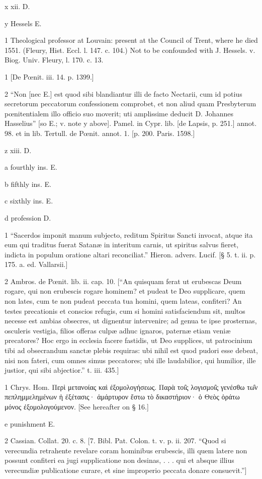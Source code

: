 x
xii. D.

y
Hessels E.

1
Theological professor at Louvain: present at the Council of Trent, where he died 1551. (Fleury, Hist. Eccl. l. 147. c. 104.) Not to be confounded with J. Hessels. v. Biog. Univ. Fleury, l. 170. c. 13.

1
[De Pœnit. iii. 14. p. 1399.]

2
“Non [nec E.] est quod sibi blandiantur illi de facto Nectarii, cum id potius secretorum peccatorum confessionem comprobet, et non aliud quam Presbyterum pœnitentialem illo officio suo moverit; uti amplissime deducit D. Johannes Hasselius” [so E.; v. note y above]. Pamel. in Cypr. lib. [de Lapsis, p. 251.] annot. 98. et in lib. Tertull. de Pœnit. annot. 1. [p. 200. Paris. 1598.]

z
xiii. D.

a
fourthly ins. E.

b
fifthly ins. E.

c
sixthly ins. E.

d
profession D.

1
“Sacerdos imponit manum subjecto, reditum Spiritus Sancti invocat, atque ita eum qui traditus fuerat Satanæ in interitum carnis, ut spiritus salvus fieret, indicta in populum oratione altari reconciliat.” Hieron. advers. Lucif. [§ 5. t. ii. p. 175. a. ed. Vallarsii.]

2
Ambros. de Pœnit. lib. ii. cap. 10. [“An quisquam ferat ut erubescas Deum rogare, qui non erubescis rogare hominem? et pudeat te Deo supplicare, quem non lates, cum te non pudeat peccata tua homini, quem lateas, confiteri? An testes precationis et conscios refugis, cum si homini satisfaciendum sit, multos necesse est ambias obsecres, ut dignentur intervenire; ad genua te ipse prosternas, osculeris vestigia, filios offeras culpæ adhuc ignaros, paternæ etiam veniæ precatores? Hoc ergo in ecclesia facere fastidis, ut Deo supplices, ut patrocinium tibi ad obsecrandum sanctæ plebis requiras: ubi nihil est quod pudori esse debeat, nisi non fateri, cum omnes simus peccatores; ubi ille laudabilior, qui humilior, ille justior, qui sibi abjectior.” t. iii. 435.]

1
Chrys. Hom. Περὶ μετανοίας καὶ ἐξομολογήσεως. Παρὰ τοι̑ς λογισμοι̑ς γενέσθω τω̑ν πεπλημμελημένων ἡ ἐξέτασις· ἀμάρτυρον ἔστω τὸ δικαστήριον· ὁ Θεὸς ὁράτω μόνος ἐξομολογούμενον. [See hereafter on § 16.]

e
punishment E.

2
Cassian. Collat. 20. c. 8. [7. Bibl. Pat. Colon. t. v. p. ii. 207. “Quod si verecundia retrahente revelare coram hominibus erubescis, illi quem latere non possunt confiteri ea jugi supplicatione non desinas, . . . qui et absque illius verecundiæ publicatione curare, et sine improperio peccata donare consuevit.”]

